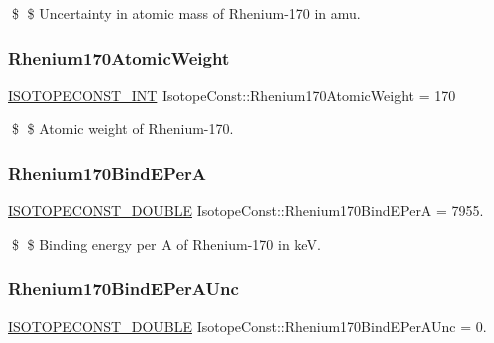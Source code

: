 \$ \$ Uncertainty in atomic mass of Rhenium-\/170 in amu. \mbox{\label{group___isotope_const-_rhenium-_re170_gaaca7844333e9202f86f9ec8b03885319}} 
\subsubsection{\texorpdfstring{Rhenium170\+Atomic\+Weight}{Rhenium170AtomicWeight}}
{\footnotesize\ttfamily \mbox{\hyperlink{group___isotope_const-_macros_ga5f18360b3e99483a35c32d789e62621c}{I\+S\+O\+T\+O\+P\+E\+C\+O\+N\+S\+T\+\_\+\+I\+NT}} Isotope\+Const\+::\+Rhenium170\+Atomic\+Weight = 170}

\$ \$ Atomic weight of Rhenium-\/170. \mbox{\label{group___isotope_const-_rhenium-_re170_ga56f613493a57e0fc4c888fdf6cb84704}} 
\subsubsection{\texorpdfstring{Rhenium170\+Bind\+E\+PerA}{Rhenium170BindEPerA}}
{\footnotesize\ttfamily \mbox{\hyperlink{group___isotope_const-_macros_ga8f45a7272ce02c0b4c65c44636ed719a}{I\+S\+O\+T\+O\+P\+E\+C\+O\+N\+S\+T\+\_\+\+D\+O\+U\+B\+LE}} Isotope\+Const\+::\+Rhenium170\+Bind\+E\+PerA = 7955.}

\$ \$ Binding energy per A of Rhenium-\/170 in keV. \mbox{\label{group___isotope_const-_rhenium-_re170_gabc6bd18f7cc4cbabf76b3e391d912eca}} 
\subsubsection{\texorpdfstring{Rhenium170\+Bind\+E\+Per\+A\+Unc}{Rhenium170BindEPerAUnc}}
{\footnotesize\ttfamily \mbox{\hyperlink{group___isotope_const-_macros_ga8f45a7272ce02c0b4c65c44636ed719a}{I\+S\+O\+T\+O\+P\+E\+C\+O\+N\+S\+T\+\_\+\+D\+O\+U\+B\+LE}} Isotope\+Const\+::\+Rhenium170\+Bind\+E\+Per\+A\+Unc = 0.}

